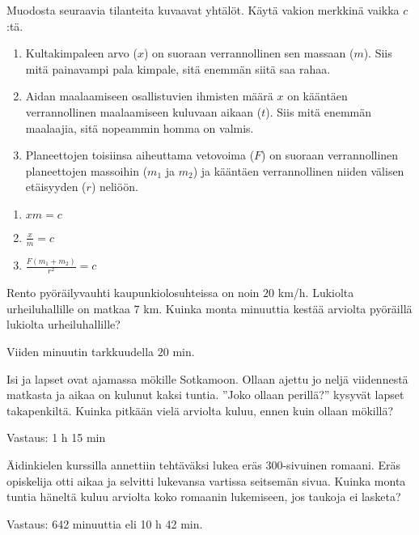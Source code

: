 \begin{tehtava}
Muodosta seuraavia tilanteita kuvaavat yhtälöt. Käytä vakion merkkinä vaikka $c$:tä.
\begin{enumerate}
\item Kultakimpaleen arvo ($x$) on suoraan verrannollinen sen massaan ($m$). Siis mitä painavampi pala kimpale, sitä enemmän siitä saa rahaa.
\item Aidan maalaamiseen osallistuvien ihmisten määrä {$x$} on kääntäen verrannollinen maalaamiseen kuluvaan aikaan ($t$). Siis mitä enemmän maalaajia, sitä nopeammin homma on valmis.
\item Planeettojen toisiinsa aiheuttama vetovoima ($F$) on suoraan verrannollinen planeettojen massoihin ($m_1$ ja $m_2$) ja kääntäen verrannollinen niiden välisen etäisyyden ($r$) neliöön.
\end{enumerate}
\begin{vastaus}
\begin{enumerate}
\item $ xm=c$
\item $ \frac{x}{m}=c $
\item $ \frac{F(m_1+m_2)}{r^2}=c$
\end{enumerate}
\end{vastaus}
\end{tehtava}

\begin{tehtava}
Rento pyöräilyvauhti kaupunkiolosuhteissa on noin $20$ km/h. Lukiolta urheiluhallille on matkaa $7$ km. Kuinka monta minuuttia kestää arviolta pyöräillä lukiolta urheiluhallille?
\begin{vastaus}
Viiden minuutin tarkkuudella $20$ min.
\end{vastaus}
\end{tehtava}

\begin{tehtava}
    Isi ja lapset ovat ajamassa mökille Sotkamoon. Ollaan ajettu jo neljä
    viidennestä matkasta ja aikaa on kulunut kaksi tuntia. ''Joko ollaan perillä?''
    kysyvät lapset takapenkiltä. Kuinka pitkään vielä arviolta kuluu, ennen
    kuin ollaan mökillä?
    
    \begin{vastaus}
        Vastaus: 1 h 15 min
    \end{vastaus}
\end{tehtava}

\begin{tehtava}
    Äidinkielen kurssilla annettiin tehtäväksi lukea eräs 300-sivuinen romaani.
    Eräs opiskelija otti aikaa ja selvitti lukevansa vartissa seitsemän sivua.
    Kuinka monta tuntia häneltä kuluu arviolta koko romaanin lukemiseen, jos
    taukoja ei lasketa?
    
    \begin{vastaus}
        Vastaus: 642 minuuttia eli 10 h 42 min.
    \end{vastaus}
\end{tehtava}
